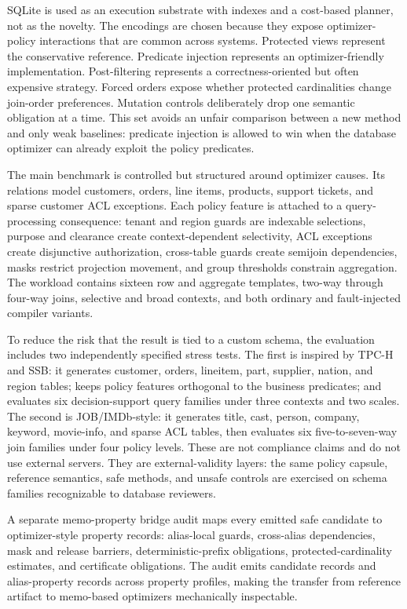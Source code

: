 \documentclass[conference]{IEEEtran}
\begin{document}
SQLite is used as an execution substrate with indexes and a cost-based planner, not as the novelty. The encodings are chosen because they expose optimizer-policy interactions that are common across systems. Protected views represent the conservative reference. Predicate injection represents an optimizer-friendly implementation. Post-filtering represents a correctness-oriented but often expensive strategy. Forced orders expose whether protected cardinalities change join-order preferences. Mutation controls deliberately drop one semantic obligation at a time. This set avoids an unfair comparison between a new method and only weak baselines: predicate injection is allowed to win when the database optimizer can already exploit the policy predicates.

The main benchmark is controlled but structured around optimizer causes. Its relations model customers, orders, line items, products, support tickets, and sparse customer ACL exceptions. Each policy feature is attached to a query-processing consequence: tenant and region guards are indexable selections, purpose and clearance create context-dependent selectivity, ACL exceptions create disjunctive authorization, cross-table guards create semijoin dependencies, masks restrict projection movement, and group thresholds constrain aggregation. The workload contains sixteen row and aggregate templates, two-way through four-way joins, selective and broad contexts, and both ordinary and fault-injected compiler variants.

To reduce the risk that the result is tied to a custom schema, the evaluation includes two independently specified stress tests. The first is inspired by TPC-H and SSB: it generates customer, orders, lineitem, part, supplier, nation, and region tables; keeps policy features orthogonal to the business predicates; and evaluates six decision-support query families under three contexts and two scales. The second is JOB/IMDb-style: it generates title, cast, person, company, keyword, movie-info, and sparse ACL tables, then evaluates six five-to-seven-way join families under four policy levels. These are not compliance claims and do not use external servers. They are external-validity layers: the same policy capsule, reference semantics, safe methods, and unsafe controls are exercised on schema families recognizable to database reviewers.

A separate memo-property bridge audit maps every emitted safe candidate to optimizer-style property records: alias-local guards, cross-alias dependencies, mask and release barriers, deterministic-prefix obligations, protected-cardinality estimates, and certificate obligations. The audit emits \MemoCandidateRecords{} candidate records and \MemoAliasPropertyRecords{} alias-property records across \MemoProfileCount{} property profiles, making the transfer from reference artifact to memo-based optimizers mechanically inspectable.
\end{document}
